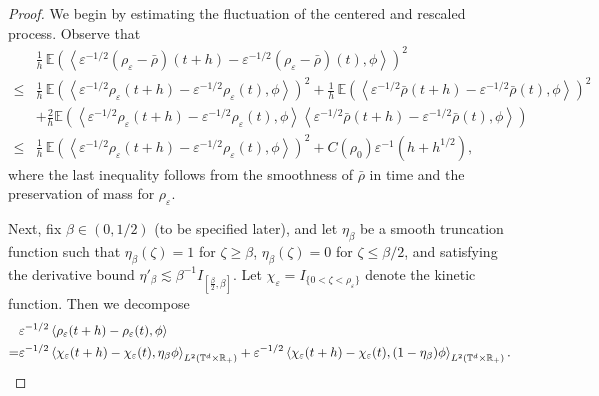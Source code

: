\documentclass[UTF-8,reqno]{amsart}
\numberwithin{equation}{section}
\def\geq{\geqslant}
\def\leq{\leqslant}
\def\geq{\geqslant}
\def\leq{\leqslant}
\begin{document}
\begin{proof}
We begin by estimating the fluctuation of the centered and rescaled process. Observe that
\begin{align*}
&\frac{1}{h} \, \mathbb{E} \left( \left\langle \varepsilon^{-1/2}(\rho_{\varepsilon} - \bar{\rho})(t + h) - \varepsilon^{-1/2}(\rho_{\varepsilon} - \bar{\rho})(t), \phi \right\rangle \right)^2\\ 
\leq& \frac{1}{h} \, \mathbb{E} \left( \left\langle \varepsilon^{-1/2} \rho_{\varepsilon}(t + h) - \varepsilon^{-1/2} \rho_{\varepsilon}(t), \phi \right\rangle \right)^2 + \frac{1}{h} \, \mathbb{E} \left( \left\langle \varepsilon^{-1/2} \bar{\rho}(t + h) - \varepsilon^{-1/2} \bar{\rho}(t), \phi \right\rangle \right)^2 \\
&+\frac{2}{h}\mathbb{E}\left( \left\langle \varepsilon^{-1/2} \rho_{\varepsilon}(t + h) - \varepsilon^{-1/2} \rho_{\varepsilon}(t), \phi \right\rangle\left\langle \varepsilon^{-1/2} \bar{\rho}(t + h) - \varepsilon^{-1/2} \bar{\rho}(t), \phi \right\rangle \right)\\
\leq& \frac{1}{h} \, \mathbb{E} \left( \left\langle \varepsilon^{-1/2} \rho_{\varepsilon}(t + h) - \varepsilon^{-1/2} \rho_{\varepsilon}(t), \phi \right\rangle \right)^2 
+ C(\rho_0) \varepsilon^{-1} (h+h^{1/2}),
\end{align*}
where the last inequality follows from the smoothness of $\bar{\rho}$ in time and the preservation of mass for $\rho_{\varepsilon}$. 

Next, fix $\beta \in (0, 1/2)$ (to be specified later), and let $\eta_{\beta}$ be a smooth truncation function such that $\eta_{\beta}(\zeta) = 1$ for $\zeta \geq \beta$, $\eta_{\beta}(\zeta) = 0$ for $\zeta \leq \beta/2$, and satisfying the derivative bound $\eta'_{\beta} \lesssim \beta^{-1} I_{\left[\frac{\beta}{2}, \beta\right]}$. Let $\chi_{\varepsilon} = I_{\{0 < \zeta < \rho_{\varepsilon}\}}$ denote the kinetic function. Then we decompose
\begin{align}\label{expansion}
&\varepsilon^{-1/2} \left\langle \rho_{\varepsilon}(t + h) - \rho_{\varepsilon}(t), \phi \right\rangle\notag\\ 
=& \varepsilon^{-1/2} \left\langle \chi_{\varepsilon}(t + h) - \chi_{\varepsilon}(t), \eta_{\beta} \phi \right\rangle_{L^2(\mathbb{T}^d\times\mathbb{R}_+)}
+ \varepsilon^{-1/2} \left\langle \chi_{\varepsilon}(t + h) - \chi_{\varepsilon}(t), (1 - \eta_{\beta}) \phi \right\rangle_{L^2(\mathbb{T}^d\times\mathbb{R}_+)}.
\end{align}


\end{proof}
\end{document}
